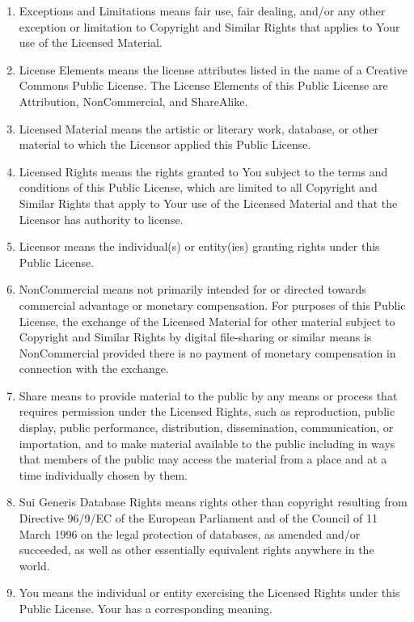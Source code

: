 \documentclass[
]{scrbook}
\begin{document}
\begin{enumerate}
\item
  Exceptions and Limitations means fair use, fair dealing, and/or any
  other exception or limitation to Copyright and Similar Rights that
  applies to Your use of the Licensed Material.
\item
  License Elements means the license attributes listed in the name of a
  Creative Commons Public License. The License Elements of this Public
  License are Attribution, NonCommercial, and ShareAlike.
\item
  Licensed Material means the artistic or literary work, database, or
  other material to which the Licensor applied this Public License.
\item
  Licensed Rights means the rights granted to You subject to the terms
  and conditions of this Public License, which are limited to all
  Copyright and Similar Rights that apply to Your use of the Licensed
  Material and that the Licensor has authority to license.
\item
  Licensor means the individual(s) or entity(ies) granting rights under
  this Public License.
\item
  NonCommercial means not primarily intended for or directed towards
  commercial advantage or monetary compensation. For purposes of this
  Public License, the exchange of the Licensed Material for other
  material subject to Copyright and Similar Rights by digital
  file-sharing or similar means is NonCommercial provided there is no
  payment of monetary compensation in connection with the exchange.
\item
  Share means to provide material to the public by any means or process
  that requires permission under the Licensed Rights, such as
  reproduction, public display, public performance, distribution,
  dissemination, communication, or importation, and to make material
  available to the public including in ways that members of the public
  may access the material from a place and at a time individually chosen
  by them.
\item
  Sui Generis Database Rights means rights other than copyright
  resulting from Directive 96/9/EC of the European Parliament and of the
  Council of 11 March 1996 on the legal protection of databases, as
  amended and/or succeeded, as well as other essentially equivalent
  rights anywhere in the world.
\item
  You means the individual or entity exercising the Licensed Rights
  under this Public License. Your has a corresponding meaning.
\end{enumerate}
\end{document}
